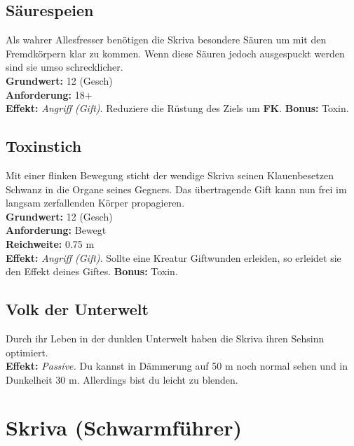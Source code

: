 \subsection*{Säurespeien}
Als wahrer Allesfresser benötigen die Skriva besondere Säuren um mit den Fremdkörpern klar zu kommen. Wenn diese Säuren jedoch ausgespuckt werden sind sie umso schrecklicher.\\
\textbf{Grundwert:} 12 (Gesch) \\
\textbf{Anforderung:} 18+ \\
\textbf{Effekt:} \textit{Angriff (Gift)}. Reduziere die Rüstung des Ziels um \textbf{FK}. \textbf{Bonus:} Toxin.

\subsection*{Toxinstich}
Mit einer flinken Bewegung sticht der wendige Skriva seinen Klauenbesetzen Schwanz in die Organe seines Gegners. Das übertragende Gift kann nun frei im langsam zerfallenden Körper propagieren.\\
\textbf{Grundwert:} 12 (Gesch) \\
\textbf{Anforderung:} Bewegt \\
\textbf{Reichweite:} 0.75 m \\
\textbf{Effekt:} \textit{Angriff (Gift)}. Sollte eine Kreatur Giftwunden erleiden, so erleidet sie den Effekt deines Giftes. \textbf{Bonus:} Toxin.

\subsection*{Volk der Unterwelt}
Durch ihr Leben in der dunklen Unterwelt haben die Skriva ihren Sehsinn optimiert.\\
\textbf{Effekt:} \textit{Passive.} Du kannst in Dämmerung auf 50 m noch normal sehen und in Dunkelheit 30 m. Allerdings bist du leicht zu blenden.


\section*{Skriva (Schwarmführer)}

